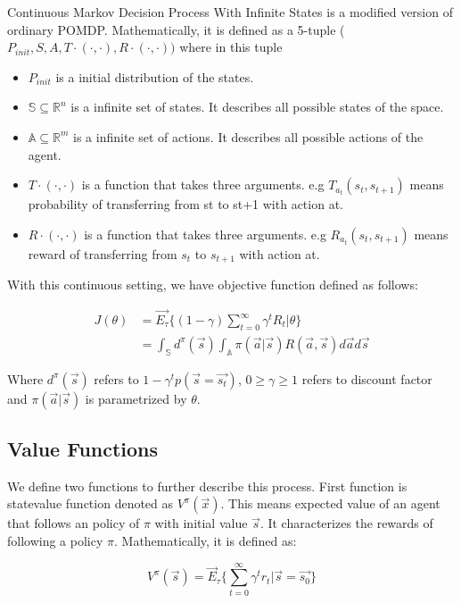 \documentclass[officiallayout]{tktla}
\begin{document}
Continuous Markov Decision Process With Infinite States is a modified version of ordinary POMDP. Mathematically, it is defined as a 5-tuple ($P_{init},S,A,T\cdot(\cdot,\cdot),R\cdot(\cdot,\cdot))$ where in this tuple
\begin{itemize}
\item	$P_{init}$ is a initial distribution of the states.
\item	$\mathbb{S} \subseteq \mathbb{R}^n$ is a infinite set of states. It describes all possible states of the space.
\item	$\mathbb{A} \subseteq \mathbb{R}^m$ is a infinite set of actions. It describes all possible actions of the agent.
\item	$T\cdot(\cdot,\cdot)$ is a function that takes three arguments. e.g $T_{a_t}(s_t,s_{t+1})$ means probability of transferring from st to st+1 with action at.
\item	$R\cdot(\cdot,\cdot)$ is a function that takes three arguments. e.g $R_{a_t}(s_t,s_{t+1})$ means reward of transferring from $s_t$ to $s_{t+1}$ with action at.
\end{itemize}

With this continuous setting, we have objective function defined as follows:

\begin{align}
J(\theta) &= \vec{E_\tau}\{(1-\gamma)\sum_{t=0}^{\infty}\gamma^tR_t|\theta\} \\
&= \int_\mathbb{S}d^\pi(\vec{s})\int_\mathbb{A}\pi(\vec{a}|\vec{s})R(\vec{a}, \vec{s})d\vec{a}d\vec{s}
\end{align}

Where $d^\pi(\vec{s})$ refers to $1 - \gamma^tp(\vec{s} = \vec{s_t})$, $0 \geq \gamma \geq 1$ refers to discount factor and $\pi(\vec{a}|\vec{s})$ is parametrized by $\theta$.
\subsection{Value Functions}
We define two functions to further describe this process. First function is statevalue
function denoted as $V^\pi(\vec{x})$. This means expected value of an agent that follows
an policy of $\pi$ with initial value $\vec{s}$. It characterizes the rewards of following a policy $\pi$. Mathematically, it is defined as:

\begin{equation}
V^\pi(\vec{s}) = \vec{E}_\tau\{\sum_{t=0}^\infty\gamma^tr_t|\vec{s} = \vec{s_0}\}
\end{equation}
\end{document}
